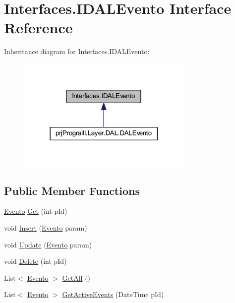 \hypertarget{interface_interfaces_1_1_i_d_a_l_evento}{}\section{Interfaces.\+I\+D\+A\+L\+Evento Interface Reference}
\label{interface_interfaces_1_1_i_d_a_l_evento}


Inheritance diagram for Interfaces.\+I\+D\+A\+L\+Evento\+:
\nopagebreak
\begin{figure}[H]
\begin{center}
\leavevmode
\includegraphics[width=242pt]{interface_interfaces_1_1_i_d_a_l_evento__inherit__graph}
\end{center}
\end{figure}
\subsection*{Public Member Functions}
\begin{DoxyCompactItemize}
\item 
\hyperlink{classprj_progra_i_i_i_1_1_layer_1_1_entities_1_1_evento}{Evento} \hyperlink{interface_interfaces_1_1_i_d_a_l_evento_a2a6665c82b5721edc25723109e1add77}{Get} (int p\+Id)
\item 
void \hyperlink{interface_interfaces_1_1_i_d_a_l_evento_a52962146e03ae6b9b86e487e01640832}{Insert} (\hyperlink{classprj_progra_i_i_i_1_1_layer_1_1_entities_1_1_evento}{Evento} param)
\item 
void \hyperlink{interface_interfaces_1_1_i_d_a_l_evento_a891007642c180aaf3224fd217361bd7b}{Update} (\hyperlink{classprj_progra_i_i_i_1_1_layer_1_1_entities_1_1_evento}{Evento} param)
\item 
void \hyperlink{interface_interfaces_1_1_i_d_a_l_evento_a8d651965fc1b755f5409a8f05fc293c3}{Delete} (int p\+Id)
\item 
List$<$ \hyperlink{classprj_progra_i_i_i_1_1_layer_1_1_entities_1_1_evento}{Evento} $>$ \hyperlink{interface_interfaces_1_1_i_d_a_l_evento_a5e84cfafdfe63179fa12003120e4d1cf}{Get\+All} ()
\item 
List$<$ \hyperlink{classprj_progra_i_i_i_1_1_layer_1_1_entities_1_1_evento}{Evento} $>$ \hyperlink{interface_interfaces_1_1_i_d_a_l_evento_ab7b63b6b4b49fea14ead7a91733ed973}{Get\+Active\+Events} (Date\+Time p\+Id)
\end{DoxyCompactItemize}


